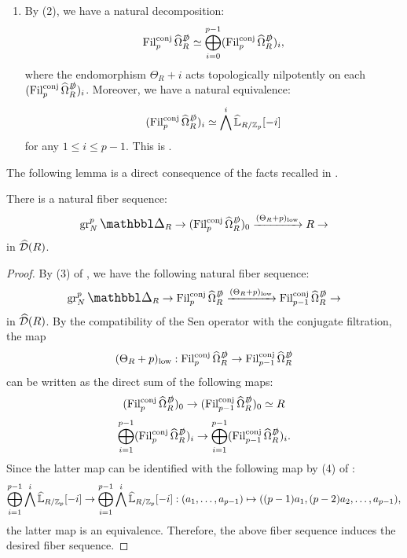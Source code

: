 \documentclass[11pt,a4paper]{amsart}
\begin{document}
\begin{proposition}
\begin{enumerate}
        Then there is a natural equivalence in $\widehat{\mcalD}(R)$:\[\gr_N^p\prism _R\simeq \Fib((\Theta_R+p)_{\mathrm{low}}:\Fil_p^{\conj}\widehat\Omega_R^{\slashed D}\to \Fil_{p-1}^{\conj}\widehat\Omega_R^{\slashed D}),\] where $\gr_N^p\prism _R$ is the $p$-th graded piece of the Nygaard filtration on the prismatic cohomology $\prism_R$. This is \cite[Remark 5.5.8]{bhatt2022Absolute}.
        \item By (2), we have a natural decomposition:\[\operatorname{Fil}_p^{\operatorname{conj}}\widehat\Omega_R^{\slashed D}\simeq \bigoplus _{i=0}^{p-1}(\operatorname{Fil}_p^{\operatorname{conj}}\widehat\Omega_{R}^{\slashed D})_i,\] where the endomorphism \(\Theta_R + i\) acts topologically nilpotently on each \((\operatorname{Fil}_p^{\operatorname{conj}}\widehat\Omega_{R}^{\slashed D})_i\).
        Moreover, we have a natural equivalence:
        \[(\operatorname{Fil}_p^{\operatorname{conj}}\widehat\Omega_R^{\slashed D})_i\simeq \bigwedge^i\widehat{\mathbb{L}}_{R/\mathbb{Z}_p}[-i]\] for any $1\le i\le p-1$. This is \cite[Section 6.2]{petrov2025Nondecomposability}.
    \end{enumerate}
\end{proposition}
The following lemma is a direct consequence of the facts recalled in .
\begin{lemma}\label{lemma2.3}
    There is a natural fiber sequence:
    \[\gr_N^p\prism _R\to (\Fil_p^{\conj}\widehat\Omega_R^{\slashed D})_0\xrightarrow[]{(\Theta_R+p)_{\mathrm{low}}} R\to\] in $\widehat{\mcalD}(R)$.
\end{lemma}
\begin{proof}
    By (3) of , we have the following natural fiber sequence:
    \[\gr_N^p\prism _R\to \Fil_p^{\conj}\widehat\Omega_R^{\slashed D}\xrightarrow[]{(\Theta_R+p)_{\mathrm{low}}} \Fil_{p-1}^{\conj}\widehat\Omega_R^{\slashed D}\to \] in $\widehat{\mcalD}(R)$. By the compatibility of the Sen operator with the conjugate filtration, the map \[(\Theta_R+p)_{\mathrm{low}}:\operatorname{Fil}_p^{\operatorname{conj}}\widehat\Omega_R^{\slashed D}\to \operatorname{Fil}_{p-1}^{\operatorname{conj}}\widehat\Omega_R^{\slashed D}\] can be written as the direct sum of the following maps:
    \[(\operatorname{Fil}_p^{\operatorname{conj}}\widehat\Omega_R^{\slashed D})_0\to (\operatorname{Fil}_{p-1}^{\operatorname{conj}}\widehat\Omega_R^{\slashed D})_0\simeq R\]
    \[\bigoplus_{i=1}^{p-1}(\operatorname{Fil}_p^{\operatorname{conj}}\widehat\Omega_R^{\slashed D})_i\to \bigoplus_{i=1}^{p-1}(\operatorname{Fil}_{p-1}^{\operatorname{conj}}\widehat\Omega_R^{\slashed D})_i.\] Since the latter map can be identified with the following map by (4) of :\[\bigoplus_{i=1}^{p-1}\bigwedge^i\widehat{\mathbb{L}}_{R/\mathbb{Z}_p}[-i]\to \bigoplus_{i=1}^{p-1}\bigwedge^i\widehat{\mathbb{L}}_{R/\mathbb{Z}_p}[-i]:(a_1,\dots,a_{p-1})\mapsto ((p-1)a_1,(p-2)a_2,\dots,a_{p-1}),\] the latter map is an equivalence. Therefore, the above fiber sequence induces the desired fiber sequence. 
\end{proof}
\end{document}
